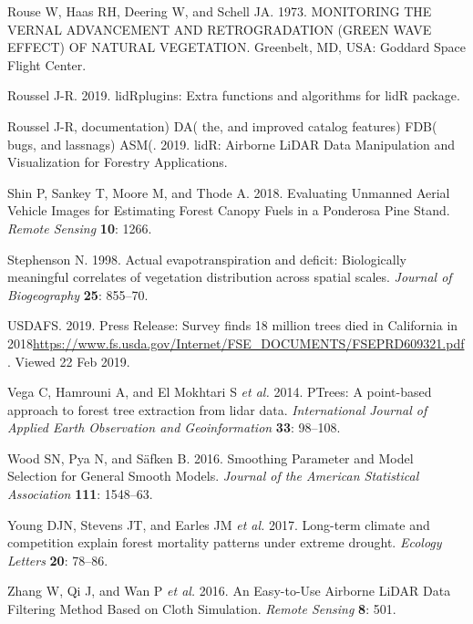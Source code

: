 \documentclass[]{article}
\begin{document}
\hypertarget{ref-rouse1973}{}
Rouse W, Haas RH, Deering W, and Schell JA. 1973. MONITORING THE VERNAL
ADVANCEMENT AND RETROGRADATION (GREEN WAVE EFFECT) OF NATURAL
VEGETATION. Greenbelt, MD, USA: Goddard Space Flight Center.

\hypertarget{ref-roussel2019a}{}
Roussel J-R. 2019. lidRplugins: Extra functions and algorithms for lidR
package.

\hypertarget{ref-roussel2019}{}
Roussel J-R, documentation) DA( the, and improved catalog features) FDB(
bugs, and lassnags) ASM(. 2019. lidR: Airborne LiDAR Data Manipulation
and Visualization for Forestry Applications.

\hypertarget{ref-shin2018}{}
Shin P, Sankey T, Moore M, and Thode A. 2018. Evaluating Unmanned Aerial
Vehicle Images for Estimating Forest Canopy Fuels in a Ponderosa Pine
Stand. \emph{Remote Sensing} \textbf{10}: 1266.

\hypertarget{ref-stephenson1998}{}
Stephenson N. 1998. Actual evapotranspiration and deficit: Biologically
meaningful correlates of vegetation distribution across spatial scales.
\emph{Journal of Biogeography} \textbf{25}: 855--70.

\hypertarget{ref-usdafs2019}{}
USDAFS. 2019. Press Release: Survey finds 18 million trees died in
California in
2018\url{https://www.fs.usda.gov/Internet/FSE_DOCUMENTS/FSEPRD609321.pdf}.
Viewed 22 Feb 2019.

\hypertarget{ref-vega2014}{}
Vega C, Hamrouni A, and El Mokhtari S \emph{et al.} 2014. PTrees: A
point-based approach to forest tree extraction from lidar data.
\emph{International Journal of Applied Earth Observation and
Geoinformation} \textbf{33}: 98--108.

\hypertarget{ref-wood2016}{}
Wood SN, Pya N, and Säfken B. 2016. Smoothing Parameter and Model
Selection for General Smooth Models. \emph{Journal of the American
Statistical Association} \textbf{111}: 1548--63.

\hypertarget{ref-young2017}{}
Young DJN, Stevens JT, and Earles JM \emph{et al.} 2017. Long-term
climate and competition explain forest mortality patterns under extreme
drought. \emph{Ecology Letters} \textbf{20}: 78--86.

\hypertarget{ref-zhang2016}{}
Zhang W, Qi J, and Wan P \emph{et al.} 2016. An Easy-to-Use Airborne
LiDAR Data Filtering Method Based on Cloth Simulation. \emph{Remote
Sensing} \textbf{8}: 501.
\end{document}
